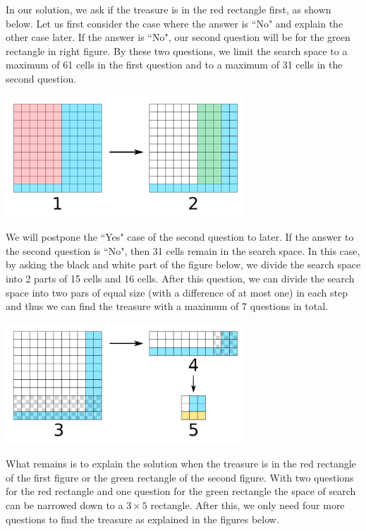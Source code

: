 \begin{solution}
In our solution, we ask if the treasure is in the  red rectangle first, as shown below. Let us first consider the case where the answer is ``No" and explain the other case later. If the answer is ``No", our second question will be for the green rectangle in right figure. By these two questions, we limit the search space to a maximum of 61 cells in the first question and to a maximum of 31 cells in the second question. 

\begin{center}
	\includegraphics[width=9cm]{28/figs/28_diagram1.png}
\end{center}


 We will postpone the ``Yes" case of the second question to later. If the answer to the second question is ``No", then 31 cells remain in the search space. In this case, by asking the black and white part of the figure below, we divide the search space into 2 parts of 15 cells and 16 cells.  After this question, we can divide the search space into two pars of equal size (with a difference of at most one) in each step and thus we can find the treasure with a maximum of 7 questions in total.

\begin{center}
	\includegraphics[width=9cm]{28/figs/28_diagram2.png}
\end{center}

 
 What remains is to explain the solution when the treasure is in the red rectangle of the first figure or the green rectangle of the second figure. With two questions for the red rectangle and one question for the green rectangle the space of search can be narrowed down to a  $3 \times 5$ rectangle. After this, we only need four more questions to find the treasure as explained in the figures below. 
 

\end{solution}
